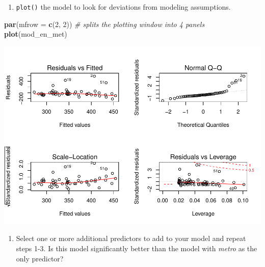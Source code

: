 \documentclass[]{book}
\newenvironment{Shaded}{\begin{snugshade}}{\end{snugshade}}
\newcommand{\CommentTok}[1]{\textcolor[rgb]{0.56,0.35,0.01}{\textit{#1}}}
\newcommand{\DataTypeTok}[1]{\textcolor[rgb]{0.13,0.29,0.53}{#1}}
\newcommand{\DecValTok}[1]{\textcolor[rgb]{0.00,0.00,0.81}{#1}}
\newcommand{\KeywordTok}[1]{\textcolor[rgb]{0.13,0.29,0.53}{\textbf{#1}}}
\newcommand{\NormalTok}[1]{#1}
\newcommand{\OperatorTok}[1]{\textcolor[rgb]{0.81,0.36,0.00}{\textbf{#1}}}
\newcommand{\StringTok}[1]{\textcolor[rgb]{0.31,0.60,0.02}{#1}}
\providecommand{\tightlist}{%
  \setlength{\itemsep}{0pt}\setlength{\parskip}{0pt}}
\begin{document}
\begin{enumerate}
\def\labelenumi{\arabic{enumi}.}
\setcounter{enumi}{2}
\tightlist
\item
  \texttt{plot()} the model to look for deviations from modeling assumptions.
\end{enumerate}

\begin{Shaded}
\begin{Highlighting}[]
  \KeywordTok{par}\NormalTok{(}\DataTypeTok{mfrow =} \KeywordTok{c}\NormalTok{(}\DecValTok{2}\NormalTok{, }\DecValTok{2}\NormalTok{)) }\CommentTok{# splits the plotting window into 4 panels}
  \KeywordTok{plot}\NormalTok{(mod_en_met)}
\end{Highlighting}
\end{Shaded}

\includegraphics{R/Rmodels/figures/unnamed-chunk-102-1.pdf}

\begin{enumerate}
\def\labelenumi{\arabic{enumi}.}
\setcounter{enumi}{3}
\tightlist
\item
  Select one or more additional predictors to add to your model and repeat steps 1-3. Is this model significantly better than the model with \emph{metro} as the only predictor?
\end{enumerate}

\begin{Shaded}
\end{Shaded}
\end{document}
